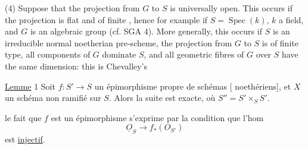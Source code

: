 (4) Suppose that the projection from $G$ to $S$ is universally open. This occurs if the projection is flat and of  finite , hence for example if $S=\operatorname{Spec}(k)$, $k$ a field, and $G$ is an algebraic group (cf. SGA 4). More generally, this occurs if $S$ is an irreducible normal noetherian pre-scheme, the projection from $G$ to $S$ is  of finite type, all components of $G$ dominate $S$, and all geometric fibres of $G$ over $S$ have the same dimension: this is Chevalley's

\uline{Lemme} 1 Soit $f:S'\longrightarrow S$ un épimorphisme propre de schémas [ noethériens], et  $X$ un schéma  non ramifié sur $S$. Alors la suite
est exacte, où $S''=S'\times_S S'$.

 le fait que $f$ est un épimorphisme s'exprime par la condition que l'hom
\[
\underline O_S\longrightarrow f_*(O_{S'})
\]
est \uline{injectif}.

